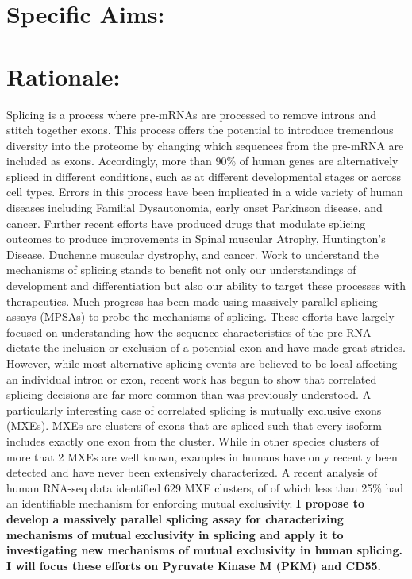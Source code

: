 \documentclass{article}
\begin{document}
\section*{Specific Aims:}
%
\section*{Rationale: } 
Splicing is a process where pre-mRNAs are processed to remove introns and stitch together exons. 
This process offers the potential to introduce tremendous diversity into the proteome by changing which sequences from the pre-mRNA are included as exons.
Accordingly, more than 90\% of human genes are alternatively spliced in different conditions, such as at different developmental stages or across cell types.\cite{Wang2008-ej} 
Errors in this process have been implicated in a wide variety of human diseases including Familial Dysautonomia, early onset Parkinson disease, and cancer.\cite{Scotti2015-yp} 
Further recent efforts have produced drugs that modulate splicing outcomes to produce improvements in Spinal muscular Atrophy, Huntington's Disease, Duchenne muscular dystrophy, and cancer.\cite{Neil2022-vf}
Work to understand the mechanisms of splicing stands to benefit not only our understandings of development and differentiation but also our ability to target these processes with therapeutics.
Much progress has been made using massively parallel splicing assays (MPSAs) to probe the mechanisms of splicing.\cite{Ke2018-af, Julien2016-wa, Adamson2018-va, Soemedi2017-pz, Cortes-Lopez2022-gy, Schirman2021-ss, Mikl2019-ng, Braun2018-mb, Soucek2019-iq, Baeza-Centurion2020-tn, Cheung2019-ah, Baeza-Centurion2019-hz, Rosenberg2015-zs, Wong2018-vq} 
These efforts have largely focused on understanding how the sequence characteristics of the pre-RNA dictate the inclusion or exclusion of a potential exon and have made great strides.
However, while most alternative splicing events are believed to be local affecting an individual intron or exon, recent work has begun to show that correlated splicing decisions are far more common than was previously understood.\cite{Zhu2021-fs, Tilgner2015-sb, Hatje2017-oj} 
A particularly interesting case of correlated splicing is mutually exclusive exons (MXEs). 
MXEs are clusters of exons that are spliced such that every isoform includes exactly one exon from the cluster. 
While in other species clusters of more that 2 MXEs are well known, examples in humans have only recently been detected and have never been extensively characterized.\cite{Jin2018-tq, Hatje2017-oj} 
A recent analysis of human RNA-seq data identified 629 MXE clusters, of of which less than 25\% had an identifiable mechanism for enforcing mutual exclusivity.\cite{Hatje2017-oj} 
\textbf{I propose to develop a massively parallel splicing assay for characterizing mechanisms of mutual exclusivity in splicing and apply it to investigating new mechanisms of mutual exclusivity in human splicing. I will focus these efforts on Pyruvate Kinase M (PKM) and CD55.} 
\\
\end{document}
